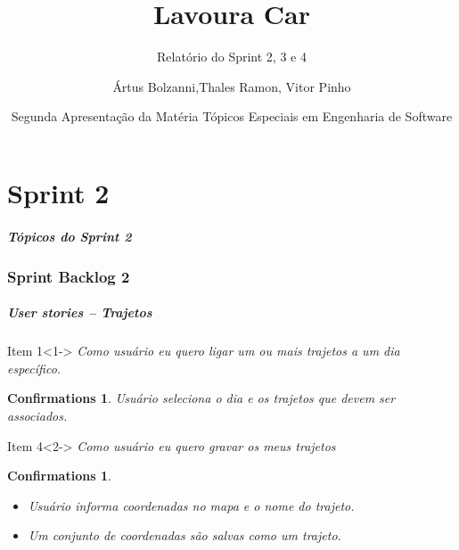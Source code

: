 \documentclass[hyperref={pdfpagelabels=false},11pt]{beamer}
\author{Ártus Bolzanni,Thales Ramon, Vitor Pinho}
\title{Lavoura Car}
\subtitle{Relatório do Sprint 2, 3 e  4}
\date[UNEB-SI 2010.2]{Segunda Apresentação da Matéria Tópicos Especiais em Engenharia de Software}
\institute[UNEB]{Universidade Estadual da Bahia}
\newtheorem{confirmations}[theorem]{Confirmations}
\begin{document}
	\begin{frame}
		\titlepage
	\end{frame}
	
	\part{Sprint 2}
		\begin{frame}
			\frametitle{Tópicos do Sprint 2}
			\tableofcontents[pausesections]
		\end{frame}
		
		\section{Sprint Backlog 2}
	
			\begin{frame}
				\frametitle{User stories -- Trajetos}
				\begin{block}{Item 1}<1->
					\emph{Como usuário eu quero ligar um ou mais trajetos a um dia específico.}
				\begin{confirmations}
						{Usuário seleciona o dia e os trajetos que devem ser associados.}
				\end{confirmations}	

				\end{block}
				\begin{block}{Item 4}<2->
					\emph{Como usuário eu quero gravar os meus trajetos}
					\begin{confirmations}
						\begin{itemize}
							\item Usuário informa coordenadas no mapa e o nome do trajeto.
							\item Um conjunto de coordenadas são salvas como um trajeto.
						\end{itemize}
					\end{confirmations}
				\end{block} 								
			\end{frame}
			
\end{document}
